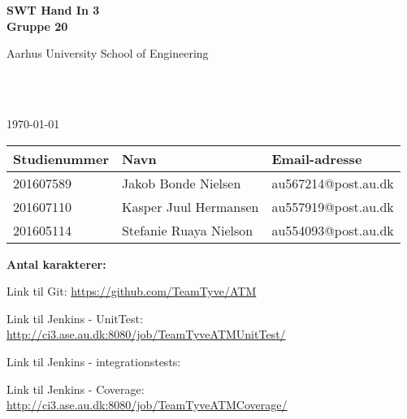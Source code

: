 \begin{center}
	{\fontsize{36pt}{0}\selectfont
		\textbf{
		SWT Hand In 3\\
		Gruppe 20\\
		}
	}
	\vspace{20pt}

	{\fontsize{14pt}{0}\selectfont
		Aarhus University School of Engineering\\
	}
	\vspace{20pt}

	{\fontsize{24pt}{0}\selectfont
		\thetitle\\
	}
	\vspace{20pt}

	{\fontsize{18pt}{0}\selectfont
		\ifdefined\frontpageDate
			\frontpageDate\\
		\else
			\today\\
		\fi
	}
	\vspace{20pt}

	\vspace{5pt}
	\begin{tabular}{|l|l|l|}
		\hline
		\rowcolor{gray!50}
		\textbf{Studienummer} & \textbf{Navn} & \textbf{Email-adresse} \\ [5px]
		\hline
		201607589 & Jakob Bonde Nielsen & au567214@post.au.dk\\
		\hline
		201607110 & Kasper Juul Hermansen & au557919@post.au.dk\\
		\hline
		201605114 & Stefanie Ruaya Nielson & au554093@post.au.dk\\
		\hline
	\end{tabular}


	\ifdefined\frontpageCharacters
		\vspace{10pt}
		\textbf{Antal karakterer: } \frontpageCharacters\\
	\fi
	\vspace{30pt}

\end{center}

Link til Git: \url{https://github.com/TeamTyve/ATM} \newline

Link til Jenkins - UnitTest: \url{http://ci3.ase.au.dk:8080/job/TeamTyveATMUnitTest/} \newline

Link til Jenkins - integrationstests: \newline 

Link til Jenkins - Coverage: \url{http://ci3.ase.au.dk:8080/job/TeamTyveATMCoverage/} 

